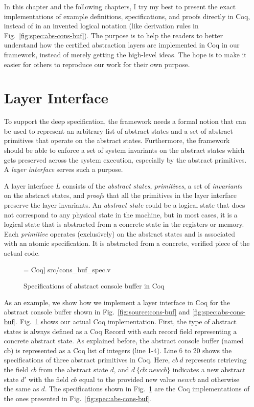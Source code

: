 In this chapter and the following chapters, I try my best to present the exact
implementations of example definitions, specifications, and proofs
directly in Coq, instead of in an invented logical notation
(like derivation rules in Fig.~\ref{fig:spec:abs-cons-buf}).
The purpose is to help the readers to better understand how the certified
abstraction layers are implemented in Coq in our framework, instead of
merely getting the high-level ideas. The hope is to make it easier for others to
reproduce our work for their own purpose.


\section{Layer Interface}
\label{sec:layer_interface}
To support the deep specification, the framework needs a formal notion
that can be used to represent an arbitrary list of abstract states
and a set of abstract primitives that operate on the abstract states. 
Furthermore, the framework should be able to enforce a set of system
invariants on the abstract states which gets preserved across
the system execution, especially by the abstract primitives.
A {\em layer interface} serves such a purpose.

A layer interface $L$ consists of the {\em abstract states}, {\em
  primitives}, a set of {\em invariants} on the abstract states, and
{\em proofs} that all the primitives in the layer interface preserve
the layer invariants.  An {\em abstract state} could be a logical
state that does not correspond to any physical state in the machine,
but in most cases, it is a logical state that is abstracted from a
concrete state in the registers or memory. Each {\em primitive}
operates (exclusively) on the abstract states and is associated with an atomic
specification. It is abstracted from a concrete, verified piece of the
actual code.  

\begin{figure}
 = Coq] {src/cons_buf_spec.v}
\caption{Specifications of abstract console buffer in Coq}
\label{fig:cons_buf_spec}
\end{figure}

As an example, we show how we implement a layer interface in Coq
for the abstract console buffer shown in Fig.~\ref{fig:source:cons-buf}
and \ref{fig:spec:abs-cons-buf}. Fig.~\ref{fig:cons_buf_spec} shows
our actual Coq implementation. First, the type of abstract states
is always defined as a Coq \textsf{Record} with each record field
representing a concrete abstract state.
As explained before, the abstract console buffer (named \textsf{cb})
is represented as a Coq list of integers (line 1-4).
Line 6 to 20 shows the specifications of three abstract primitives
in Coq. Here, $cb~d$ represents retrieving the field $cb$ from the
abstract state $d$, and $d~\{cb: newcb\}$ indicates a new abstract state
$d'$ with the field $cb$ equal to the provided new value $newcb$ and
otherwise the same as $d$. The specifications shown in Fig.~\ref{fig:cons_buf_spec}
are the Coq implementations of the ones presented in Fig.~\ref{fig:spec:abs-cons-buf}.

